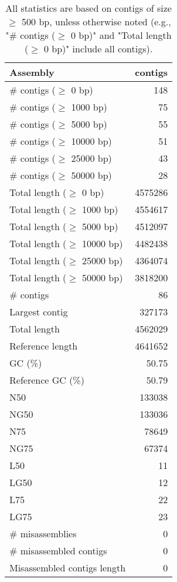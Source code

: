 \documentclass[12pt,a4paper]{article}
\begin{document}
\begin{table}[ht]
\begin{center}
\caption{All statistics are based on contigs of size $\geq$ 500 bp, unless otherwise noted (e.g., "\# contigs ($\geq$ 0 bp)" and "Total length ($\geq$ 0 bp)" include all contigs).}
\begin{tabular}{|l*{1}{|r}|}
\hline
Assembly & contigs \\ \hline
\# contigs ($\geq$ 0 bp) & 148 \\ \hline
\# contigs ($\geq$ 1000 bp) & 75 \\ \hline
\# contigs ($\geq$ 5000 bp) & 55 \\ \hline
\# contigs ($\geq$ 10000 bp) & 51 \\ \hline
\# contigs ($\geq$ 25000 bp) & 43 \\ \hline
\# contigs ($\geq$ 50000 bp) & 28 \\ \hline
Total length ($\geq$ 0 bp) & 4575286 \\ \hline
Total length ($\geq$ 1000 bp) & 4554617 \\ \hline
Total length ($\geq$ 5000 bp) & 4512097 \\ \hline
Total length ($\geq$ 10000 bp) & 4482438 \\ \hline
Total length ($\geq$ 25000 bp) & 4364074 \\ \hline
Total length ($\geq$ 50000 bp) & 3818200 \\ \hline
\# contigs & 86 \\ \hline
Largest contig & 327173 \\ \hline
Total length & 4562029 \\ \hline
Reference length & 4641652 \\ \hline
GC (\%) & 50.75 \\ \hline
Reference GC (\%) & 50.79 \\ \hline
N50 & 133038 \\ \hline
NG50 & 133036 \\ \hline
N75 & 78649 \\ \hline
NG75 & 67374 \\ \hline
L50 & 11 \\ \hline
LG50 & 12 \\ \hline
L75 & 22 \\ \hline
LG75 & 23 \\ \hline
\# misassemblies & 0 \\ \hline
\# misassembled contigs & 0 \\ \hline
Misassembled contigs length & 0 \\ \hline

\end{tabular}
\end{center}
\end{table}
\end{document}
